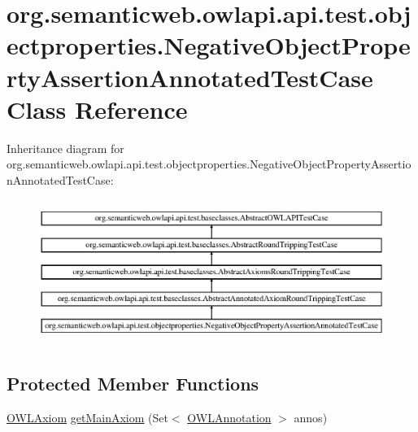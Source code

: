 \hypertarget{classorg_1_1semanticweb_1_1owlapi_1_1api_1_1test_1_1objectproperties_1_1_negative_object_property_assertion_annotated_test_case}{\section{org.\-semanticweb.\-owlapi.\-api.\-test.\-objectproperties.\-Negative\-Object\-Property\-Assertion\-Annotated\-Test\-Case Class Reference}
\label{classorg_1_1semanticweb_1_1owlapi_1_1api_1_1test_1_1objectproperties_1_1_negative_object_property_assertion_annotated_test_case}
}
Inheritance diagram for org.\-semanticweb.\-owlapi.\-api.\-test.\-objectproperties.\-Negative\-Object\-Property\-Assertion\-Annotated\-Test\-Case\-:\begin{figure}[H]
\begin{center}
\leavevmode
\includegraphics[height=4.697987cm]{classorg_1_1semanticweb_1_1owlapi_1_1api_1_1test_1_1objectproperties_1_1_negative_object_property_assertion_annotated_test_case}
\end{center}
\end{figure}
\subsection*{Protected Member Functions}
\begin{DoxyCompactItemize}
\item 
\hyperlink{interfaceorg_1_1semanticweb_1_1owlapi_1_1model_1_1_o_w_l_axiom}{O\-W\-L\-Axiom} \hyperlink{classorg_1_1semanticweb_1_1owlapi_1_1api_1_1test_1_1objectproperties_1_1_negative_object_property_assertion_annotated_test_case_a655e62067cbe92f4803466b7d4a5afb5}{get\-Main\-Axiom} (Set$<$ \hyperlink{interfaceorg_1_1semanticweb_1_1owlapi_1_1model_1_1_o_w_l_annotation}{O\-W\-L\-Annotation} $>$ annos)
\end{DoxyCompactItemize}
